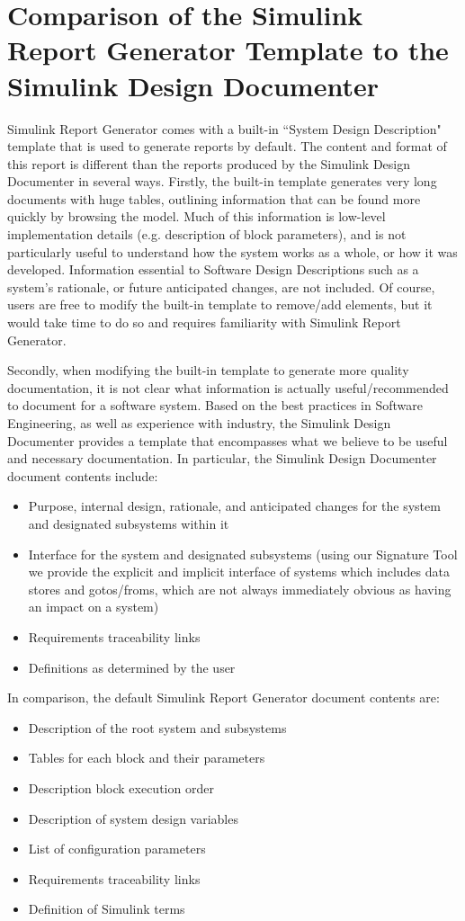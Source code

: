 \documentclass{mcscert}
\newcommand{\simulink}{Simulink}
\newcommand{\rptgen}{\simulink{} Report Generator}
\newcommand{\sigtool}{Signature Tool}
\newcommand{\sddtool}{Simulink Design Documenter}
\begin{document}
\section{Comparison of the Simulink Report Generator Template to the \sddtool{}}
\rptgen{} comes with a built-in ``System Design Description" template that is 
used to generate reports by default. 
The content and format of this report is different than the reports produced by 
the \sddtool{} in several ways. 
Firstly, the built-in template generates very long documents with huge tables, 
outlining information that can be found more quickly by browsing the model. 
Much of this information is low-level implementation details 
(e.g. description of block parameters), 
and is not particularly useful to understand how the system works as a whole, or
how it was developed. 
Information essential to Software Design Descriptions such as a system's 
rationale, or future anticipated changes, are not included. 
Of course, users are free to modify the built-in template to remove/add 
elements, but it would take time to do so and requires familiarity with \rptgen{}. 

Secondly, when modifying the built-in template to generate more quality 
documentation, it is not clear what information is actually useful/recommended 
to document for a software system. 
Based on the best practices in Software Engineering, as well as experience with 
industry, the \sddtool{} provides a template that encompasses what we believe to
be useful and necessary documentation. 
In particular, the \sddtool{} document contents include:

\begin{itemize}
	\item Purpose, internal design, rationale, and anticipated changes for the system and designated subsystems within it 
	\item Interface for the system and designated subsystems (using our \sigtool{} we provide the explicit and implicit interface of systems which includes data stores and gotos/froms, which are not always immediately obvious as having an impact on a system)
	\item Requirements traceability links
	\item Definitions as determined by the user
\end{itemize}

\noindent In comparison, the default \rptgen{} document contents are:
\begin{itemize}
	\item Description of the root system and subsystems
	\item Tables for each block and their parameters
	\item Description block execution order
	\item Description of system design variables
	\item List of configuration parameters
	\item Requirements traceability links
	\item Definition of \simulink{} terms
\end{itemize}
\end{document}
